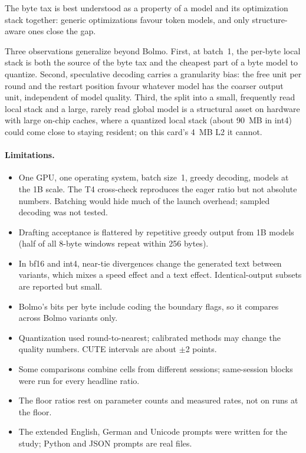 \documentclass[11pt,a4paper]{article}
\begin{document}
The byte tax is best understood as a property of a model and its optimization stack together: generic optimizations favour token models, and only structure-aware ones close the gap.

Three observations generalize beyond Bolmo. First, at batch~1, the per-byte local stack is both the source of the byte tax and the cheapest part of a byte model to quantize. Second, speculative decoding carries a granularity bias: the free unit per round and the restart position favour whatever model has the coarser output unit, independent of model quality. Third, the split into a small, frequently read local stack and a large, rarely read global model is a structural asset on hardware with large on-chip caches, where a quantized local stack (about 90~MB in int4) could come close to staying resident; on this card's 4~MB L2 it cannot.

\paragraph{Limitations.}
\begin{itemize}
  \item One GPU, one operating system, batch size~1, greedy decoding, models at the 1B scale. The T4 cross-check reproduces the eager ratio but not absolute numbers. Batching would hide much of the launch overhead; sampled decoding was not tested.
  \item Drafting acceptance is flattered by repetitive greedy output from 1B models (half of all 8-byte windows repeat within 256 bytes).
  \item In bf16 and int4, near-tie divergences change the generated text between variants, which mixes a speed effect and a text effect. Identical-output subsets are reported but small.
  \item Bolmo's bits per byte include coding the boundary flags, so it compares across Bolmo variants only.
  \item Quantization used round-to-nearest; calibrated methods may change the quality numbers. CUTE intervals are about $\pm$2 points.
  \item Some comparisons combine cells from different sessions; same-session blocks were run for every headline ratio.
  \item The floor ratios rest on parameter counts and measured rates, not on runs at the floor.
  \item The extended English, German and Unicode prompts were written for the study; Python and JSON prompts are real files.
\end{itemize}
\end{document}
